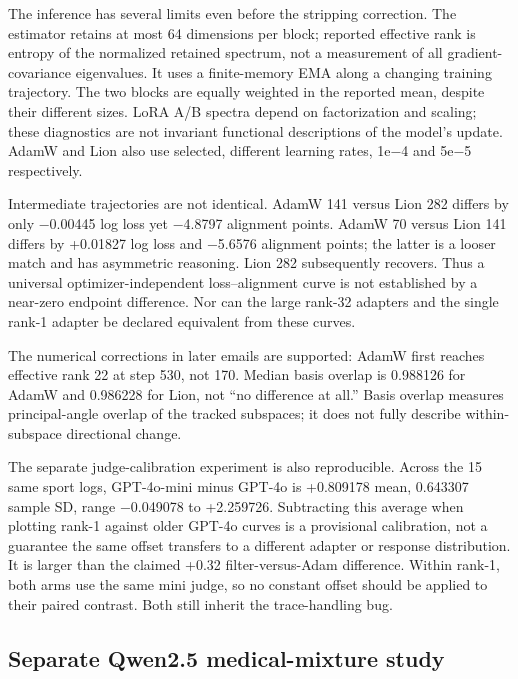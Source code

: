 \documentclass[
  british,
  10pt,
  a4paper,
]{article}
\begin{document}
The inference has several limits even before the stripping
correction.\allowbreak{} The estimator retains at most 64 dimensions per
block; reported effective rank is entropy of the normalized retained
spectrum, not a measurement of all gradient-\allowbreak{}covariance
eigenvalues.\allowbreak{} It uses a finite-\allowbreak{}memory EMA along
a changing training trajectory.\allowbreak{} The two blocks are equally
weighted in the reported mean, despite their different sizes. LoRA A/B
spectra depend on factorization and scaling; these diagnostics are not
invariant functional descriptions of the model's update. AdamW and Lion
also use selected, different learning rates, 1e−4 and 5e−5
respectively\allowbreak{}.\allowbreak{}

Intermediate trajectories are not identical. AdamW 141 versus Lion 282
differs by only −0.00445 log loss yet −4.8797 alignment points. AdamW 70
versus Lion 141 differs by +0.01827 log loss and −5.6576 alignment
points; the latter is a looser match and has asymmetric reasoning. Lion
282 subsequently recovers. Thus a universal
optimizer-\allowbreak{}independent loss--alignment curve is not
established by a near-zero endpoint difference.\allowbreak{} Nor can the
large rank-32 adapters and the single rank-1 adapter be declared
equivalent from these curves.

The numerical corrections in later emails are supported: AdamW first
reaches effective rank 22 at step 530, not 170. Median basis overlap is
0.988126 for AdamW and 0.986228 for Lion, not ``no difference at all.''
Basis overlap measures principal-\allowbreak{}angle overlap of the
tracked subspaces; it does not fully describe
within-\allowbreak{}subspace directional change.

The separate judge-\allowbreak{}calibration experiment is also
reproducible\allowbreak{}.\allowbreak{} Across the 15 same sport logs,
GPT-\allowbreak{}4o-\allowbreak{}mini minus GPT-4o is +0.809178 mean,
0.643307 sample SD, range −0.049078 to +2.259726. Subtracting this
average when plotting rank-1 against older GPT-4o curves is a
provisional calibration,\allowbreak{} not a guarantee the same offset
transfers to a different adapter or response
distribution\allowbreak{}.\allowbreak{} It is larger than the claimed
+0.32 filter-\allowbreak{}versus-\allowbreak{}Adam
difference.\allowbreak{} Within rank-1, both arms use the same mini
judge, so no constant offset should be applied to their paired contrast.
Both still inherit the trace-\allowbreak{}handling bug.

\subsection{\texorpdfstring{Separate Qwen2.5
medical-\allowbreak{}mixture
study}{Separate Qwen2.5  study}}\label{em-results-audit--separate-qwen2.5-medical-mixture-study}
\end{document}

